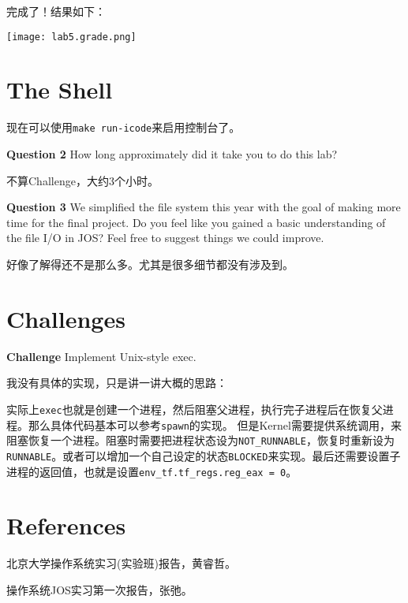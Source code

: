 \documentclass[11pt]{article}
\begin{document}
完成了！结果如下：
\begin{center}
\texttt{[image: lab5.grade.png]}
\end{center}

\section{The Shell}
现在可以使用\lstinline|make run-icode|来启用控制台了。
\begin{framed}
\noindent\textbf{Question 2} How long approximately did it take you to do this lab?
\end{framed}

不算Challenge，大约3个小时。

\begin{framed}
\noindent\textbf{Question 3} We simplified the file system this year with the goal of making more time for the final project. Do you feel like you gained a basic understanding of the file I/O in JOS? Feel free to suggest things we could improve.
\end{framed}

好像了解得还不是那么多。尤其是很多细节都没有涉及到。

\section{Challenges}
\begin{framed}
\noindent\textbf{Challenge} Implement Unix-style exec.
\end{framed}

我没有具体的实现，只是讲一讲大概的思路：

实际上\lstinline|exec|也就是创建一个进程，然后阻塞父进程，执行完子进程后在恢复父进程。那么具体代码基本可以参考\lstinline|spawn|的实现。
但是Kernel需要提供系统调用，来阻塞恢复一个进程。阻塞时需要把进程状态设为\lstinline|NOT_RUNNABLE|，恢复时重新设为\lstinline|RUNNABLE|。或者可以增加一个自己设定的状态\lstinline|BLOCKED|来实现。最后还需要设置子进程的返回值，也就是设置\lstinline|env_tf.tf_regs.reg_eax = 0|。

\section{References}
北京大学操作系统实习(实验班)报告，黄睿哲。

操作系统JOS实习第一次报告，张弛。
\end{document}
